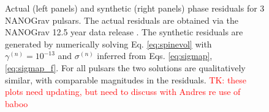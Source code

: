 \documentclass[fleqn,usenatbib,useAMS]{mnras}
\begin{document}
\begin{figure}
	\caption{Actual (left panels) and synthetic (right panels) phase residuals for 3 NANOGrav pulsars. The actual residuals are obtained via the NANOGrav 12.5 year data release \citep{nanograv_narrowband_DR}. The synthetic residuals are generated by numerically solving Eq. \ref{eq:spinevol} with $\gamma^{(n)} = 10^{-13}$ and $\sigma^{(n)}$ inferred from Eqs. \ref{eq:sigmap}, \ref{eq:sigmap_f}. For all pulsars the two solutions are qualitatively similar, with comparable magnitudes in the residuals. \textcolor{red}{TK: these plots need updating, but need to discuss with Andres re use of baboo}}
	\label{fig:qualitative_compare}
\end{figure}






%
%
\end{document}
